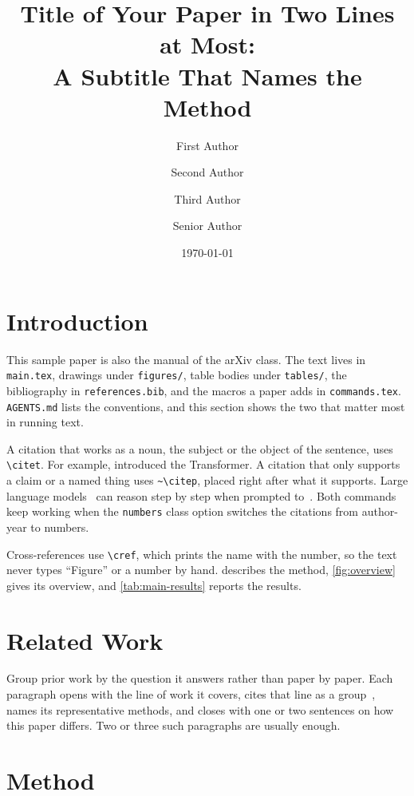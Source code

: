 \documentclass{banglab}
\title{Title of Your Paper in Two Lines at Most:\\ A Subtitle That Names the Method}
\author[1,2,*]{First Author}
\author[1,2,*]{Second Author}
\author[1,2]{Third Author}
\author[1,2,3,\dagger]{Senior Author}
\affiliation[1]{Mila -- Quebec AI Institute}
\affiliation[2]{Universit\'e de Montr\'eal}
\affiliation[3]{Canada CIFAR AI Chair}
\date{\today}
\begin{document}
\maketitle

\section{Introduction}
\label{sec:introduction}

This sample paper is also the manual of the \labname{} arXiv class.
The text lives in \texttt{main.tex}, drawings under \texttt{figures/}, table bodies under \texttt{tables/}, the bibliography in \texttt{references.bib}, and the macros a paper adds in \texttt{commands.tex}.
\texttt{AGENTS.md} lists the conventions, and this section shows the two that matter most in running text.

A citation that works as a noun, the subject or the object of the sentence, uses \verb|\citet|.
For example, \citet{vaswani2017attention} introduced the Transformer.
A citation that only supports a claim or a named thing uses \verb|~\citep|, placed right after what it supports.
Large language models~\citep{brown2020language} can reason step by step when prompted to~\citep{wei2022chain}.
Both commands keep working when the \texttt{numbers} class option switches the citations from author-year to numbers.

Cross-references use \verb|\cref|, which prints the name with the number, so the text never types ``Figure'' or a number by hand.
 describes the method, \cref{fig:overview} gives its overview, and \cref{tab:main-results} reports the results.

\section{Related Work}
\label{sec:related-work}

Group prior work by the question it answers rather than paper by paper.
Each paragraph opens with the line of work it covers, cites that line as a group~\citep{brown2020language,wei2022chain}, names its representative methods, and closes with one or two sentences on how this paper differs.
Two or three such paragraphs are usually enough.

\section{Method}
\label{sec:method}
\end{document}
